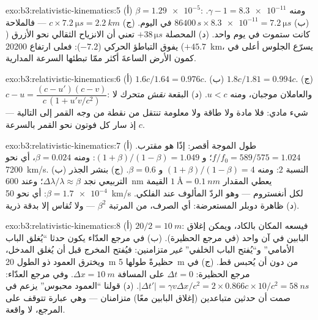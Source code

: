 \begin{solution}{exo:b3:relativistic-kinematics:5}
(أ) $\beta = \num{1.29e-5}$: ومنه $\gamma - 1 = \num{8.3e-11}$. (ب)
$86400\,\unit{s} \times \num{8.3e-11} = \qty{7.2}{\micro s}$ في اليوم.
(ج) $c \times \qty{7.2}{\micro s} = \qty{2.2}{km}$ --- فالملاحة
كانت ستموت في يوم واحد. (د) المحصلة $+38\,\unit{\micro s}$ تعني أن
الانزياح الثقالي نحو الأزرق ($+45.7$) يفوق التباطؤ الحركي
($-7.2$): فعلى ارتفاع \qty{20200}{km}، يسرّع الجلوس أعلى في كمون
الأرض الساعةَ أكثر ممّا تبطئها السرعة المدارية.
\end{solution}

\begin{solution}{exo:b3:relativistic-kinematics:6}
(أ) $1.6c/1.64 = 0.976c$. (ب) $1.8c/1.81 = 0.994c$. (ج) $c - u =
\dfrac{(c - u')(c - v)}{c\,(1 + u'v/c^2)}$: والعاملان موجبان، ومنه
$u < c$. (د) البقعة \emph{نقش} متحرك لا شيء مادي: فلا مادة
ولا طاقة ولا معلومة تنتقل من نقطة من وجه القمر إلى
التالية --- إذ سار كل فوتون نحو القمر بالسرعة $c$.
\end{solution}

\begin{solution}{exo:b3:relativistic-kinematics:7}
(أ) طول الموجة أقصر: إذًا هو مقترب. $f/f_0 = 589/575 = 1.024$؛
و $(1+\beta)/(1-\beta) = 1.049$: ومنه $\beta = 0.024$، أي نحو
\qty{7200}{km/s}. (ب) النسبة $2$: ومنه $(1+\beta)/(1-\beta) = 4$ و $\beta =
0.6$. (ج) بنشر الجذر التربيعي نجد $\Delta\lambda/\lambda \approx
\beta$؛ وعند \qty{600}{nm} يعطي المقدار $\qty{1}{\angstrom} = \qty{0.1}{nm}$
القيمة $\beta = \num{1.7e-4}$: أي نحو \qty{50}{km/s} لكل أنغستروم ---
وهو الردّ المألوف عند الفلكي. (د) ظاهرة دوبلر المستعرضة: أي
 الصرف، من المرتبة $\beta^2$ --- ولا تُقاس إلا بدقة
ذرية.
\end{solution}

\begin{solution}{exo:b3:relativistic-kinematics:8}
(أ) $20/2 = \qty{10}{m}$: فيسعه المكان بالكاد، ويمكن إغلاق
البابين في آن واحد (في مرجع الحظيرة). (ب) في مرجع العدّاء يكون
حدثا ``يُغلق الباب الأمامي'' و``يُفتح الباب الخلفي'' \emph{غير}
متزامنين: فيُفتح المخرج قبل أن يُغلق المدخل، ويخترق العمود ذو
الطول \qty{20}{m} حظيرةً طولها \qty{5}{m} من دون أن يُحبس قط.
(ج) في مرجع الحظيرة: $\Delta t = 0$ على المسافة $\Delta x =
\qty{10}{m}$. وفي مرجع العدّاء: $|\Delta t'| = \gamma v\Delta x/c^2 =
2 \times 0.866c \times 10/c^2 = \qty{58}{ns}$. (د) قولنا ``العمود
محبوس'' يزعم في صمت أن حدثين متباعدين (إغلاق البابين معًا)
متزامنان --- وهي عبارة تتوقف على المرجع، لا واقعة.
\end{solution}

